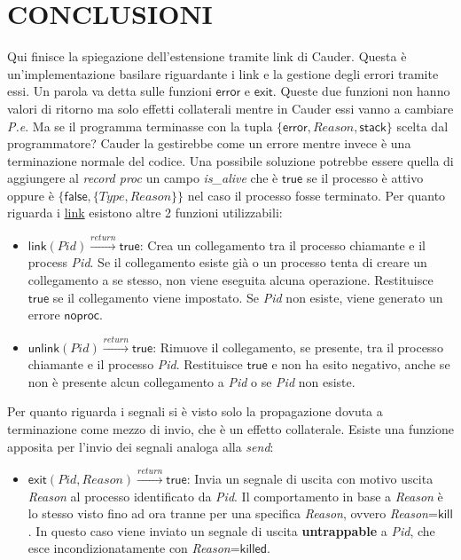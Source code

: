 \documentclass[Tesi.tex]{subfiles}
\begin{document}
\section{CONCLUSIONI}
Qui finisce la spiegazione dell'estensione tramite link di Cauder.
Questa è un'implementazione basilare riguardante i link e la gestione degli errori tramite essi.
Un parola va detta sulle funzioni $\mathsf{error}$ e $\mathsf{exit}$.
Queste due funzioni non hanno valori di ritorno ma solo effetti collaterali mentre in Cauder essi vanno a cambiare \textit{P.e}.
Ma se il programma terminasse con la tupla $\displaystyle \{\mathsf{error},Reason,\mathsf{stack}\}$ scelta dal programmatore?
Cauder la gestirebbe come un errore mentre invece è una terminazione normale del codice.
Una possibile soluzione potrebbe essere quella di aggiungere al \textit{record proc} un campo \textit{is\_alive} che è $\mathsf{true}$ se il processo è attivo oppure è $\displaystyle \{\mathsf{false},\{Type,Reason\}\}$ nel caso il processo fosse terminato. 
Per quanto riguarda i \underline{link} esistono altre 2 funzioni utilizzabili:
\begin{itemize}
	\item $\displaystyle \mathsf{link}(Pid)\xrightarrow{return}\mathsf{true}$: Crea un collegamento tra il processo chiamante e il process \textit{Pid}. Se il collegamento esiste già o un processo tenta di creare un collegamento a se stesso, non viene eseguita alcuna operazione. Restituisce $\mathsf{true}$ se il collegamento viene impostato.
	Se \textit{Pid} non esiste, viene generato un errore $\mathsf{noproc}$.
	\item $\displaystyle \mathsf{unlink}(Pid)\xrightarrow{return}\mathsf{true}$: Rimuove il collegamento, se presente, tra il processo chiamante e il processo \textit{Pid}. Restituisce $\mathsf{true}$ e non ha esito negativo, anche se non è presente alcun collegamento a \textit{Pid} o se \textit{Pid} non esiste.
\end{itemize}
Per quanto riguarda i segnali si è visto solo la propagazione dovuta a terminazione come mezzo di invio, che è un effetto collaterale.
Esiste una funzione apposita per l'invio dei segnali analoga alla \textit{send}:
\begin{itemize}
	\item $\displaystyle \mathsf{exit}(Pid,Reason)\xrightarrow{return}\mathsf{true}$: Invia un segnale di uscita con motivo uscita \textit{Reason} al processo identificato da \textit{Pid}.
	Il comportamento in base a \textit{Reason} è lo stesso visto fino ad ora tranne per una specifica \textit{Reason}, ovvero \textit{Reason}=$\mathsf{kill}$.
	In questo caso  viene inviato un segnale di uscita \textbf{untrappable} a \textit{Pid}, che esce incondizionatamente con \textit{Reason}=$\mathsf{killed}$.
\end{itemize}
\end{document}
